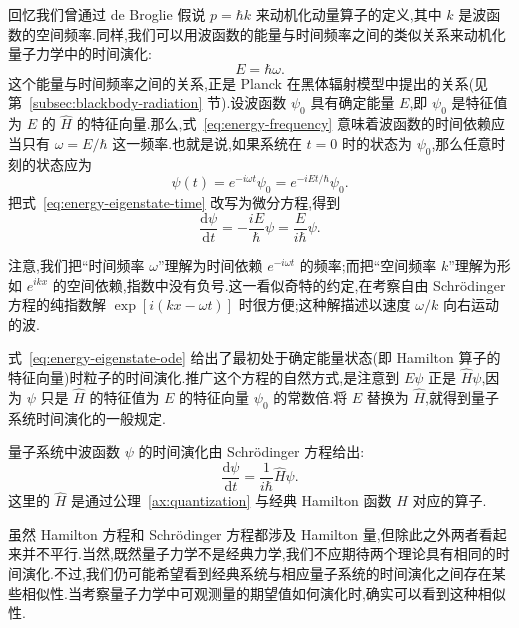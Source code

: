 回忆我们曾通过 de Broglie 假说 \(p=\hbar k\) 来动机化动量算子的定义,其中 \(k\) 是波函数的空间频率.同样,我们可以用波函数的能量与时间频率之间的类似关系来动机化量子力学中的时间演化:
\begin{equation}
E=\hbar\omega.
\label{eq:energy-frequency}
\end{equation}
这个能量与时间频率之间的关系,正是 Planck 在黑体辐射模型中提出的关系(见第~\ref{subsec:blackbody-radiation} 节).设波函数 \(\psi_{0}\) 具有确定能量 \(E\),即 \(\psi_{0}\) 是特征值为 \(E\) 的 \(\widehat H\) 的特征向量.那么,式~\eqref{eq:energy-frequency} 意味着波函数的时间依赖应当只有 \(\omega=E/\hbar\) 这一频率.也就是说,如果系统在 \(t=0\) 时的状态为 \(\psi_{0}\),那么任意时刻的状态应为
\begin{equation}
\psi(t)=e^{-i\omega t}\psi_{0}
=e^{-iEt/\hbar}\psi_{0}.
\label{eq:energy-eigenstate-time}
\end{equation}
把式~\eqref{eq:energy-eigenstate-time} 改写为微分方程,得到
\begin{equation}
\frac{\mathrm{d}\psi}{\mathrm{d}t}
=-\frac{iE}{\hbar}\psi
=\frac{E}{i\hbar}\psi.
\label{eq:energy-eigenstate-ode}
\end{equation}

注意,我们把“时间频率 \(\omega\)”理解为时间依赖 \(e^{-i\omega t}\) 的频率;而把“空间频率 \(k\)”理解为形如 \(e^{ikx}\) 的空间依赖,指数中没有负号.这一看似奇特的约定,在考察自由 Schrödinger 方程的纯指数解 \(\exp[i(kx-\omega t)]\) 时很方便;这种解描述以速度 \(\omega/k\) 向右运动的波.

式~\eqref{eq:energy-eigenstate-ode} 给出了最初处于确定能量状态(即 Hamilton 算子的特征向量)时粒子的时间演化.推广这个方程的自然方式,是注意到 \(E\psi\) 正是 \(\widehat H\psi\),因为 \(\psi\) 只是 \(\widehat H\) 的特征值为 \(E\) 的特征向量 \(\psi_{0}\) 的常数倍.将 \(E\) 替换为 \(\widehat H\),就得到量子系统时间演化的一般规定.

\begin{axiom}[公理 5:Schrödinger 方程]\label{ax:schrodinger}
量子系统中波函数 \(\psi\) 的时间演化由 Schrödinger 方程给出:
\begin{equation}
\frac{\mathrm{d}\psi}{\mathrm{d}t}
=\frac{1}{i\hbar}\widehat H\psi.
\label{eq:schrodinger-equation}
\end{equation}
这里的 \(\widehat H\) 是通过公理~\ref{ax:quantization} 与经典 Hamilton 函数 \(H\) 对应的算子.
\end{axiom}

虽然 Hamilton 方程和 Schrödinger 方程都涉及 Hamilton 量,但除此之外两者看起来并不平行.当然,既然量子力学不是经典力学,我们不应期待两个理论具有相同的时间演化.不过,我们仍可能希望看到经典系统与相应量子系统的时间演化之间存在某些相似性.当考察量子力学中可观测量的期望值如何演化时,确实可以看到这种相似性.

